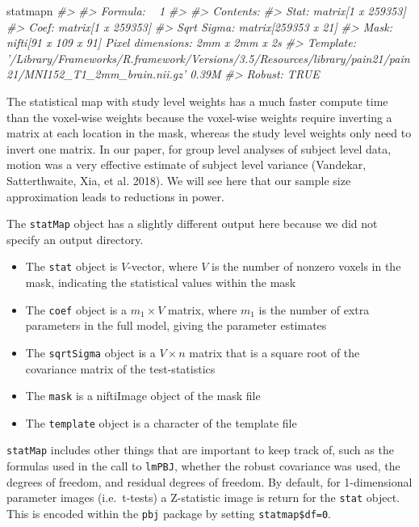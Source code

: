 \documentclass[]{article}
\newenvironment{Shaded}{\begin{snugshade}}{\end{snugshade}}
\newcommand{\CommentTok}[1]{\textcolor[rgb]{0.56,0.35,0.01}{\textit{#1}}}
\newcommand{\NormalTok}[1]{#1}
\providecommand{\tightlist}{%
  \setlength{\itemsep}{0pt}\setlength{\parskip}{0pt}}
\begin{document}
\begin{Shaded}
\begin{Highlighting}[]
\NormalTok{statmapn}
\CommentTok{#> }
\CommentTok{#> Formula: ~ 1}
\CommentTok{#> }
\CommentTok{#> Contents:}
\CommentTok{#>   Stat:       matrix[1 x 259353]}
\CommentTok{#>   Coef:       matrix[1 x 259353]}
\CommentTok{#>   Sqrt Sigma: matrix[259353 x 21]}
\CommentTok{#>   Mask:       nifti[91 x 109 x 91] Pixel dimensions: 2mm x 2mm x 2s}
\CommentTok{#>   Template:   '/Library/Frameworks/R.framework/Versions/3.5/Resources/library/pain21/pain21/MNI152_T1_2mm_brain.nii.gz' 0.39M}
\CommentTok{#>   Robust:     TRUE}
\end{Highlighting}
\end{Shaded}

The statistical map with study level weights has a much faster compute
time than the voxel-wise weights because the voxel-wise weights require
inverting a matrix at each location in the mask, whereas the study level
weights only need to invert one matrix. In our paper, for group level
analyses of subject level data, motion was a very effective estimate of
subject level variance (Vandekar, Satterthwaite, Xia, et al. 2018). We
will see here that our sample size approximation leads to reductions in
power.

The \texttt{statMap} object has a slightly different output here because
we did not specify an output directory.

\begin{itemize}
\tightlist
\item
  The \texttt{stat} object is \(V\)-vector, where \(V\) is the number of
  nonzero voxels in the mask, indicating the statistical values within
  the mask
\item
  The \texttt{coef} object is a \(m_1 \times V\) matrix, where \(m_1\)
  is the number of extra parameters in the full model, giving the
  parameter estimates
\item
  The \texttt{sqrtSigma} object is a \(V \times n\) matrix that is a
  square root of the covariance matrix of the test-statistics
\item
  The \texttt{mask} is a niftiImage object of the mask file
\item
  The \texttt{template} object is a character of the template file
\end{itemize}

\texttt{statMap} includes other things that are important to keep track
of, such as the formulas used in the call to \texttt{lmPBJ}, whether the
robust covariance was used, the degrees of freedom, and residual degrees
of freedom. By default, for 1-dimensional parameter images
(i.e.~t-tests) a Z-statistic image is return for the \texttt{stat}
object. This is encoded within the \texttt{pbj} package by setting
\texttt{statmap\$df=0}.
\end{document}

